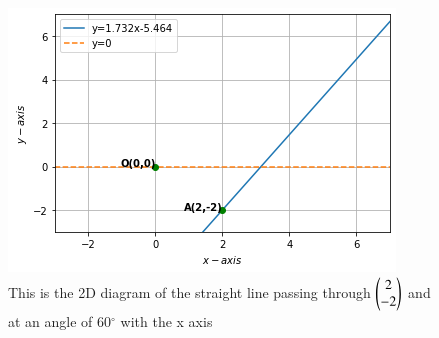 \begin{figure}[!ht]
 \begin{center}
  \includegraphics[width=\columnwidth]{solutions/2/2/2/assignment3_fig.png}
    \caption{This is the 2D diagram of the straight line passing through $\begin{pmatrix}2 \\-2\end{pmatrix}$ and at an angle of 60$^{\circ}$ with the x axis }
    \label{eq:solutions/2/2/2/myfig:1}
    \end{center}
\end{figure}
